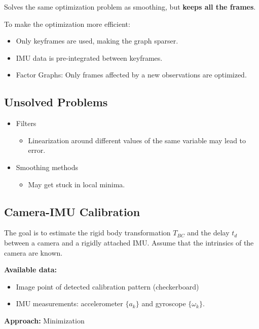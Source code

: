 \documentclass[10pt,a4paper]{scrartcl}
\begin{document}
\begin{multicols*}{2}
Solves the same optimization problem as smoothing, but \textbf{keeps all the frames}.

To make the optimization more efficient:

\begin{itemize}
\item Only keyframes are used, making the graph sparser.
\item IMU data is pre-integrated between keyframes.
\item Factor Graphs: Only frames affected by a new observations are optimized.
\end{itemize}

\subsection{Unsolved Problems}

\begin{itemize}
\item Filters
\begin{itemize}
\item Linearization around different values of the same variable may lead to error.
\end{itemize}
\item Smoothing methods
\begin{itemize}
\item May get stuck in local minima.
\end{itemize}
\end{itemize}

\subsection{Camera-IMU Calibration}

The goal is to estimate the rigid body transformation $T_{BC}$ and the delay $t_d$ between a camera and a rigidly attached IMU. Assume that the intrinsics of the camera are known.

\vspace{3ex}

\textbf{Available data:}
\begin{itemize}
\item Image point of detected calibration pattern (checkerboard)
\item IMU measurements: accelerometer $\{a_k\}$ and gyroscope $\{\omega_k\}$.
\end{itemize}

\textbf{Approach:} Minimization


\end{multicols*}
\end{document}
